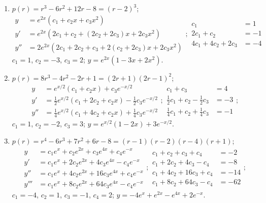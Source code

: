 \documentclass[openany]{book}
\newenvironment{sectionSolutions}{
 \begin{enumerate}[item-label={\thesection.\arabic{enumi}.}]
}{
 \end{enumerate}
}
\begin{document}
\begin{sectionSolutions}
\item
$p(r)=r^3-6r^2+12r-8=(r-2)^3$;
\[
\begin{aligned}
y&=e^{2x}(c_1+c_2x+c_3x^2)\\
y'&=e^{2x}(2c_1+c_2+(2c_2+2c_3)x+2c_3x^2)\\
y''&=2e^{2x}(2c_1+2c_2+c_3+2(c_2+2c_3)x+2c_3x^2)
\end{aligned};
\begin{aligned}
c_1&=1\\
2c_1+c_2&=-1\\
4c_1+4c_2+2c_3&=-4
\end{aligned}
\]
$c_1=1$, $c_2=-3$, $c_3=2$;
 $y=e^{2x}(1-3x+2x^2)$.


\item
$p(r)=8r^3-4r^2-2r+1=(2r+1)(2r-1)^2$;
\[
\begin{aligned}
y&=e^{x/2}(c_1+c_2x)+c_3e^{-x/2}\\
y'&=\frac{1}{2}e^{x/2}(c_1+2c_2+c_2x)-\frac{1}{2}c_3e^{-x/2}\\
y''&=\frac{1}{4}e^{x/2}(c_1+4c_2+c_2x)+\frac{1}{4}c_3e^{-x/2}
\end{aligned};
\begin{aligned}
c_1+c_3&=4\\
\frac{1}{2}c_1+c_2-\frac{1}{2}c_3&=-3\\
\frac{1}{4}c_1+c_2+\frac{1}{4}c_3&=-1
\end{aligned};
\]
$c_1=1$, $c_2=-2$, $c_3=3$;
 $y=e^{x/2}(1-2x)+3e^{-x/2}$.


\item
$p(r)=r^4-6r^3+7r^2+6r-8=(r-1)(r-2)(r-4)(r+1)$;
\[
\begin{aligned}
y&=c_1e^x+c_2e^{2x}+c_3e^{4x}+c_4e^{-x}\\
y'&=c_1e^x+2c_2e^{2x}+4c_3e^{4x}-c_4e^{-x}\\
y''&=c_1e^x+4c_2e^{2x}+16c_3e^{4x}+c_4e^{-x}\\
y'''&=c_1e^x+8c_2e^{2x}+64c_3e^{4x}-c_4e^{-x}
\end{aligned};
\begin{aligned}
c_1+c_2+c_3+c_4&=-2\\
c_1+2c_2+4c_3-c_4&=-8\\
c_1+4c_2+16c_3+c_4&=-14\\
c_1+8c_2+64c_3-c_4&=-62
\end{aligned};
\]
$c_1=-4$, $c_2=1$, $c_3=-1$, $c_4=2$;
 $y=-4e^x+e^{2x}-e^{4x}+2e^{-x}$.



\end{sectionSolutions}
\end{document}
